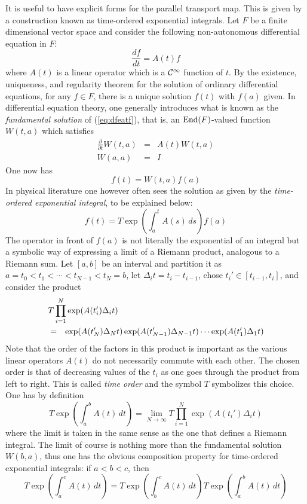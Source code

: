 \documentclass[12pt,titlepage]{article}
\def\cC{{\cal C}}
\def\End{\hbox{End}}
\begin{document}
It is useful to have explicit forms for the parallel transport map. This
is given by a construction known as time-ordered exponential integrals.
Let \(F\) be a finite dimensional vector space and consider the
following non-autono\-mous differential equation in \(F\):
\begin{equation}\label{eq:dfeatf}
\frac{df}{dt} = A(t)f
\end{equation}%
where \(A(t)\) is a  linear operator which is a \(\cC^\infty\)
function of \(t\).    By the existence, uniqueness, and regularity
theorem for the solution of ordinary differential equations, for any
\(f\in F\), there is a unique solution \(f(t)\) with \(f(a)\) given.
In differential equation theory, one generally introduces what is known
as the {\em fundamental solution\/}
%
 of (\ref{eq:dfeatf}), that is, an
\(\End(F)\)-valued function \(W(t,a)\) which satisfies
\begin{eqnarray}\label{eq:fsde}
\frac{\partial}{\partial t}W(t,a) &=& A(t)W(t,a) \\ \label{eq:fsic}
W(a,a) &=& I
\end{eqnarray}%
One now has 
\[
f(t) = W(t,a)f(a)
\]
In physical literature one however often sees the solution as 
given by the {\em time-ordered exponential
integral\/}, to be explained below:
\begin{equation}
f(t) = T \exp\left(\int_a^tA(s)\,ds\right)f(a)
\end{equation}%
The operator in front of \(f(a)\) is not literally the exponential of an
integral but a symbolic way of expressing a limit of a Riemann product,
analogous to a Riemann sum. Let \([a,b]\) be an interval and partition
it as \(a=t_0 < t_1 <
\cdots < t_{N-1} < t_N =b\), let \(\Delta_it = t_{i} -t_{i-1}\), chose
\(t_i'\in[t_{i-1},t_i]\), and consider the product
\begin{eqnarray*}
\lefteqn{T\prod_{i=1}^N \exp(A(t_i')\Delta_it)} \\ 
&= &
\exp(A(t_{N}')\Delta_{N}t)
\exp(A(t_{N-1}')\Delta_{N-1}t)
\cdots
\exp(A(t_{1}')\Delta_{1}t)
\end{eqnarray*}%
Note that the order of the factors in this product is important  as the
various linear operators \(A(t)\) do not necessarily commute with each
other. The chosen order is that of decreasing values of the \(t_i\) as one
goes through the product from left to right. This is called {\em
time order\/} and the symbol \(T\) symbolizes this choice.
 One has
by definition
\begin{equation}\label{eq:trprod}
 T \exp\left(\int_a^bA(t)\,dt\right) =
 \lim_{N\to\infty} T\prod_{i=1}^N \exp\left(A(t_i')\Delta_it\right)
 \end{equation}%
 where the limit is taken in the same sense as the one that defines a
 Riemann
 integral. The limit of course is nothing more than the fundamental
solution \(W(b,a)\), thus one has 
the obvious composition property for time-ordered
exponential integrals: if \(a<b<c\), then
\begin{equation} \label{eq:prodp}
  T \exp\left(\int_a^cA(t)\,dt\right) =T\exp\left(\int_b^cA(t)\,dt\right)
 T\exp\left(\int_a^bA(t)\,dt\right)
  \end{equation}%
\end{document}
